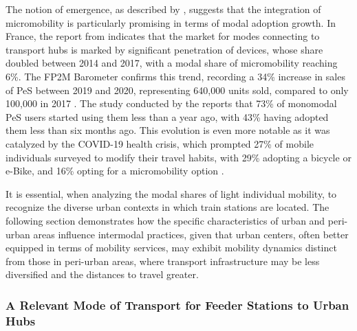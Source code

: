 \begin{refsegment}
The notion of emergence, as described by \textcolor{blue}{\textcite[4]{kostrzewska_towards_2017}}, suggests that the integration of micromobility is particularly promising in terms of modal adoption growth. In France, the report from \textcolor{blue}{\textcite[10]{ademe_observatoire_2017}} indicates that the market for modes connecting to transport hubs is marked by significant penetration of  devices, whose share doubled between 2014 and 2017, with a modal share of micromobility reaching 6\%. The FP2M Barometer confirms this trend, recording a 34\% increase in sales of \acrshort{PeS} between 2019 and 2020, representing 640,000 units sold, compared to only 100,000 in 2017 \textcolor{blue}{\autocite[2]{fp2m_barometre_2021}}. The study conducted by the \textcolor{blue}{\textcite[11]{smart_mobility_lab_usages_2020}} reports that 73\% of monomodal \acrshort{PeS} users started using them less than a year ago, with 43\% having adopted them less than six months ago. This evolution is even more notable as it was catalyzed by the COVID-19 health crisis, which prompted 27\% of mobile individuals surveyed to modify their travel habits, with 29\% adopting a bicycle or \acrshort{e-Bike}, and 16\% opting for a micromobility option \textcolor{blue}{\autocite[16]{smart_mobility_lab_usages_2020}}.%

It is essential, when analyzing the modal shares of light individual mobility, to recognize the diverse urban contexts in which train stations are located. The following section demonstrates how the specific characteristics of urban and peri-urban areas influence intermodal practices, given that urban centers, often better equipped in terms of mobility services, may exhibit mobility dynamics distinct from those in peri-urban areas, where transport infrastructure may be less diversified and the distances to travel greater.%

\subsubsection*{A Relevant Mode of Transport for Feeder Stations to Urban Hubs
    \label{chap4:part-modale-gares-centre-periurbain}
    }


\end{refsegment}

